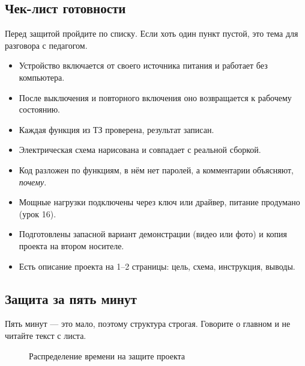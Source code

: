 \subsection{Чек-лист готовности}

Перед защитой пройдите по списку. Если хоть один пункт пустой, это тема для разговора с педагогом.

\begin{itemize}[leftmargin=*,label=]
  \item Устройство включается от своего источника питания и работает без компьютера.
  \item После выключения и повторного включения оно возвращается к рабочему состоянию.
  \item Каждая функция из ТЗ проверена, результат записан.
  \item Электрическая схема нарисована и совпадает с реальной сборкой.
  \item Код разложен по функциям, в нём нет паролей, а комментарии объясняют, \emph{почему}.
  \item Мощные нагрузки подключены через ключ или драйвер, питание продумано (урок 16).
  \item Подготовлены запасной вариант демонстрации (видео или фото) и копия проекта на втором носителе.
  \item Есть описание проекта на 1--2 страницы: цель, схема, инструкция, выводы.
\end{itemize}

\subsection{Защита за пять минут}

Пять минут --- это мало, поэтому структура строгая. Говорите о главном и не читайте текст с листа.

\begin{figure}[H]
\centering
{}
\caption{Распределение времени на защите проекта}
\end{figure}

